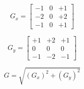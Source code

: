 \begin{equation}
  \label{eqn:sobel_feldman_horizontal_changes}
  G_x =
  \begin{bmatrix}
    -1 & 0 & +1 \\
    -2 & 0 & +2 \\
    -1 & 0 & +1
  \end{bmatrix}
\end{equation}

\begin{equation}
  \label{eqn:sobel_feldman_vertical_changes}
  G_y =
  \begin{bmatrix}
    +1 & +2 & +1 \\
    0 & 0 & 0 \\
    -1 & -2 & -1
  \end{bmatrix}
\end{equation}

\begin{equation}
  \label{eqn:sobel_feldman_grad_magnitude}
  G = \sqrt{(G_x)^2 + (G_y)^2}
\end{equation}
